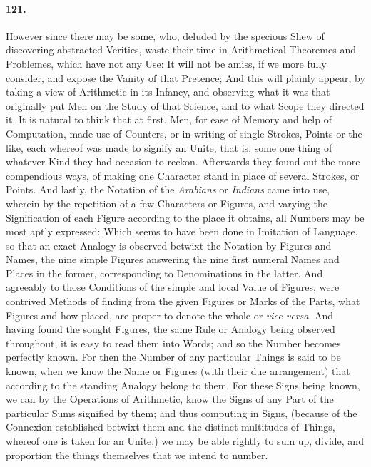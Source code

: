 \documentclass[]{article}
\newenvironment{sectionbody}{}{}
\begin{document}
\begin{sectionbody}
\paragraph{121.} However since there may be some, who, deluded by the specious
Shew of discovering abstracted Verities, waste their time in
Arithmetical Theoremes and Problemes, which have not any Use: It
will not be amiss, if we more fully consider, and expose the
Vanity of that Pretence; And this will plainly appear, by taking
a view of Arithmetic in its Infancy, and observing what it was
that originally put Men on the Study of that Science, and to what
Scope they directed it.  It is natural to think that at first,
Men, for ease of Memory and help of Computation, made use of
Counters, or in writing of single Strokes, Points or the like,
each whereof was made to signify an Unite, that is, some one
thing of whatever Kind they had occasion to reckon.  Afterwards
they found out the more compendious ways, of making one Character
stand in place of several Strokes, or Points.  And lastly, the
Notation of the \emph{Arabians} or \emph{Indians} came into
use, wherein by the repetition of a few Characters or Figures,
and varying the Signification of each Figure according to the
place it obtains, all Numbers may be most aptly expressed: Which
seems to have been done in Imitation of Language, so that an
exact Analogy is observed betwixt the Notation by Figures and
Names, the nine simple Figures answering the nine first numeral
Names and Places in the former, corresponding to Denominations in
the latter.  And agreeably to those Conditions of the simple and
local Value of Figures, were contrived Methods of finding from
the given Figures or Marks of the Parts, what Figures and how
placed, are proper to denote the whole or \emph{vice versa}.
And having found the sought Figures, the same Rule or Analogy
being observed throughout, it is easy to read them into Words;
and so the Number becomes perfectly known.  For then the Number
of any particular Things is said to be known, when we know the
Name or Figures (with their due arrangement) that according to
the standing Analogy belong to them.  For these Signs being
known, we can by the Operations of Arithmetic, know the Signs of
any Part of the particular Sums signified by them; and thus
computing in Signs, (because of the Connexion established betwixt
them and the distinct multitudes of Things, whereof one is taken
for an Unite,) we may be able rightly to sum up, divide, and
proportion the things themselves that we intend to number.




\end{sectionbody}
\end{document}
